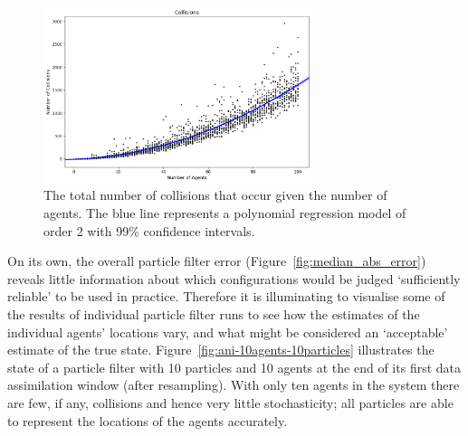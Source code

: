 \begin{figure}[ht]
	\centering
	\includegraphics[width=0.7\textwidth]{figures/results/wiggle_count}
	\caption{The total number of collisions that occur given the number of agents. The blue line represents a polynomial regression model of order 2 with 99\% confidence intervals.} \label{fig:collision_count}
\end{figure}

On its own, the overall particle filter error (Figure~\ref{fig:median_abs_error}) reveals little information about which configurations would be judged `sufficiently reliable' to be used in practice. Therefore it is illuminating to visualise some of the results of individual particle filter runs to see how the estimates of the individual agents' locations vary, and what might be considered an `acceptable' estimate of the true state. Figure~\ref{fig:ani-10agents-10particles} illustrates the state of a particle filter with 10 particles and 10 agents at the end of its first data assimilation window (after resampling). With only ten agents in the system there are few, if any, collisions and hence very little stochasticity; all particles are able to represent the locations of the agents accurately.

